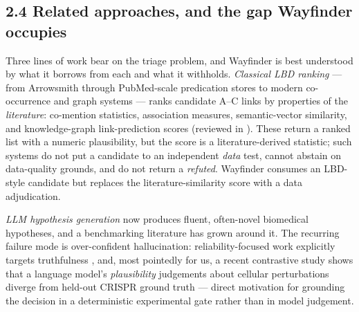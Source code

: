 \subsection*{2.4 Related approaches, and the gap Wayfinder occupies}\label{related-approaches}

Three lines of work bear on the triage problem, and Wayfinder is best understood by what it borrows from
each and what it withholds. \emph{Classical LBD ranking} --- from Arrowsmith \cite{smalheiser1998} through
PubMed-scale predication stores \cite{kilicoglu2012} to modern co-occurrence and graph systems
\cite{pyysalo2019} --- ranks candidate A--C links by properties of the \emph{literature}: co-mention
statistics, association measures, semantic-vector similarity, and knowledge-graph link-prediction scores
(reviewed in \cite{thilakaratne2019,gopalakrishnan2019}). These return a ranked list with a numeric
plausibility, but the score is a literature-derived statistic; such systems do not put a candidate to an
independent \emph{data} test, cannot abstain on data-quality grounds, and do not return a \emph{refuted}.
Wayfinder consumes an LBD-style candidate but replaces the literature-similarity score with a data
adjudication.

\emph{LLM hypothesis generation} now produces fluent, often-novel biomedical hypotheses, and a benchmarking
literature has grown around it. The recurring failure mode is over-confident hallucination: reliability-focused
work explicitly targets truthfulness \cite{truthhypo2025}, and, most pointedly for us, a recent contrastive
study shows that a language model's \emph{plausibility} judgements about cellular perturbations diverge from
held-out CRISPR ground truth \cite{plausibility2026} --- direct motivation for grounding the decision in a
deterministic experimental gate rather than in model judgement.

